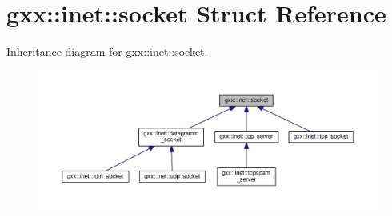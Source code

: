 \hypertarget{structgxx_1_1inet_1_1socket}{}\section{gxx\+:\+:inet\+:\+:socket Struct Reference}
\label{structgxx_1_1inet_1_1socket}


Inheritance diagram for gxx\+:\+:inet\+:\+:socket\+:
\nopagebreak
\begin{figure}[H]
\begin{center}
\leavevmode
\includegraphics[width=350pt]{structgxx_1_1inet_1_1socket__inherit__graph}
\end{center}
\end{figure}
